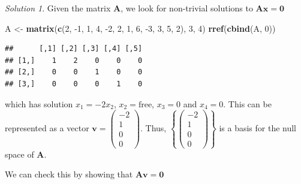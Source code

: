 \documentclass[
]{book}
\newenvironment{Shaded}{\begin{snugshade}}{\end{snugshade}}
\newcommand{\DecValTok}[1]{\textcolor[rgb]{0.00,0.00,0.81}{#1}}
\newcommand{\KeywordTok}[1]{\textcolor[rgb]{0.13,0.29,0.53}{\textbf{#1}}}
\newcommand{\NormalTok}[1]{#1}
\newcommand{\OperatorTok}[1]{\textcolor[rgb]{0.81,0.36,0.00}{\textbf{#1}}}
\newcommand{\StringTok}[1]{\textcolor[rgb]{0.31,0.60,0.02}{#1}}
\theoremstyle{definition}
\theoremstyle{definition}
\theoremstyle{definition}
\theoremstyle{definition}
\theoremstyle{remark}
\newtheorem*{solution}{Solution}
\begin{document}
\begin{solution}

Given the matrix \(\mathbf{A}\), we look for non-trivial solutions to \(\mathbf{A} \mathbf{x} = \mathbf{0}\)

\begin{Shaded}
\begin{Highlighting}[]
\NormalTok{A <-}\StringTok{ }\KeywordTok{matrix}\NormalTok{(}\KeywordTok{c}\NormalTok{(}\DecValTok{2}\NormalTok{, }\DecValTok{-1}\NormalTok{, }\DecValTok{1}\NormalTok{, }\DecValTok{4}\NormalTok{, }\DecValTok{-2}\NormalTok{, }\DecValTok{2}\NormalTok{, }\DecValTok{1}\NormalTok{, }\DecValTok{6}\NormalTok{, }\DecValTok{-3}\NormalTok{, }\DecValTok{3}\NormalTok{, }\DecValTok{5}\NormalTok{, }\DecValTok{2}\NormalTok{), }\DecValTok{3}\NormalTok{, }\DecValTok{4}\NormalTok{)}
\KeywordTok{rref}\NormalTok{(}\KeywordTok{cbind}\NormalTok{(A, }\DecValTok{0}\NormalTok{))}
\end{Highlighting}
\end{Shaded}

\begin{verbatim}
##      [,1] [,2] [,3] [,4] [,5]
## [1,]    1    2    0    0    0
## [2,]    0    0    1    0    0
## [3,]    0    0    0    1    0
\end{verbatim}

which has solution \(x_1 = -2 x_2\), \(x_2 = \mbox{free}\), \(x_3 = 0\) and \(x_4 = 0\). This can be represented as a vector \(\mathbf{v} = \begin{pmatrix} -2 \\ 1 \\ 0 \\ 0 \end{pmatrix}\). Thus, \(\left\{ \begin{pmatrix} -2 \\ 1 \\ 0 \\ 0 \end{pmatrix} \right\}\) is a basis for the null space of \(\mathbf{A}\).

We can check this by showing that \(\mathbf{A} \mathbf{v} = \mathbf{0}\)

\begin{Shaded}
\end{Shaded}


\end{solution}
\end{document}
